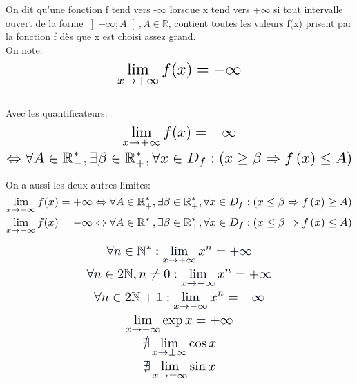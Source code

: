 \documentclass[a4paper]{article}
\renewcommand{\large}{\color{text}}
\renewcommand{\textbf}{\color{crimson}}
\begin{document}
	\newpage
	\textbf{Définition:}
	\large On dit qu'une fonction f tend vers -$\infty$ lorsque x tend vers +$\infty$
	si tout intervalle ouvert de la forme $\left]-\infty; A\right[, A\in\mathbb{R}$, contient toutes les valeurs f(x)
	prisent par la fonction f dès que x est choisi assez grand.\\
	On note:
	\begin{displaymath}
		\scaleto{\lim_{x\to+\infty} f(x) = -\infty}{25pt}
	\end{displaymath}
	\\
	\large Avec les quantificateurs:
	\begin{gather*}
		\scaleto{\lim_{x\to+\infty} f(x) = -\infty}{25pt} 
		\\
		\scaleto{\Leftrightarrow\forall A \in\mathbb{R}_{-}^{*},\exists\beta\in\mathbb{R}_{+}^{*},\forall x \in D_{f} : \left(x\geq\beta\Rightarrow f\left(x\right)\leq A \right)}{18pt}
	\end{gather*}

	
	\begin{center}
		\vspace{30pt}
		\small On a aussi les deux autres limites:
		\begin{gather*}
			\scaleto{\lim_{x\to-\infty} f(x) = +\infty\Leftrightarrow\forall A \in\mathbb{R}_{+}^{*},\exists\beta\in\mathbb{R}_{+}^{*},\forall x \in D_{f} : \left(x\leq\beta\Rightarrow f\left(x\right)\geq A \right)}{18pt}
			\\
			\scaleto{\lim_{x\to-\infty} f(x) = -\infty\Leftrightarrow\forall A \in\mathbb{R}_{-}^{*},\exists\beta\in\mathbb{R}_{+}^{*},\forall x \in D_{f} : \left(x\leq\beta\Rightarrow f\left(x\right)\leq A \right)}{18pt}
		\end{gather*}
	\end{center}

	\vspace{30pt}
	\textbf{Propriétés (Admises):}
	\begin{gather}
		\color{text} \scaleto{\forall n\in\mathbb{N}^{*}: \lim_{x\to+\infty}x^{n}=+\infty}{20pt} \label{xn} 
		\\ \color{text} \scaleto{\forall n\in2\mathbb{N}, n\neq0: \lim_{x\to-\infty}x^{n}=+\infty}{20pt}
		\\ \color{text} \scaleto{\forall n\in2\mathbb{N}+1: \lim_{x\to-\infty}x^{n}=-{\infty}}{20pt}
		\\ \color{text} \scaleto{\lim_{x\to+\infty}\exp{x}=+\infty}{20pt}
		\\ \color{text} \scaleto{\nexists\lim_{x\to\pm\infty}\cos{x}}{20pt} 
		\\ \color{text} \scaleto{\nexists\lim_{x\to\pm\infty}\sin{x}}{20pt}
	\end{gather}
\end{document}
